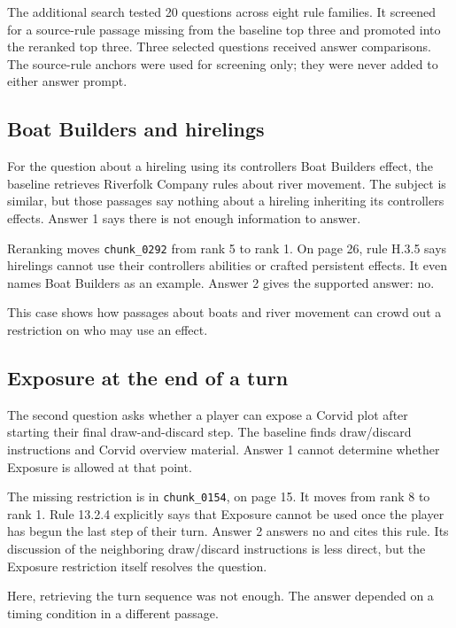 \documentclass[11pt,a4paper]{article}
\begin{document}
The additional search tested 20 questions across eight rule families.
It screened for a source-rule passage missing from the baseline top three
and promoted into the reranked top three. Three selected questions received
answer comparisons. The source-rule anchors were used for screening only;
they were never added to either answer prompt.

\subsection*{Boat Builders and hirelings}

For the question about a hireling using its
controller\textquotesingle{}s Boat Builders effect, the baseline retrieves
Riverfolk Company rules about river movement. The subject is similar, but
those passages say nothing about a hireling inheriting its
controller\textquotesingle{}s effects. Answer 1 says there is not enough
information to answer.

Reranking moves \texttt{chunk\_0292} from rank 5 to rank 1. On page 26,
rule H.3.5 says hirelings cannot use their
controller\textquotesingle{}s abilities or crafted persistent effects.
It even names Boat Builders as an example. Answer 2 gives the supported
answer: no.

This case shows how passages about boats and river movement can crowd out
a restriction on who may use an effect.

\subsection*{Exposure at the end of a turn}

The second question asks whether a player can expose a Corvid plot after
starting their final draw-and-discard step. The baseline finds draw/discard
instructions and Corvid overview material. Answer 1 cannot determine
whether Exposure is allowed at that point.

The missing restriction is in \texttt{chunk\_0154}, on page 15. It moves
from rank 8 to rank 1. Rule 13.2.4 explicitly says that Exposure cannot be
used once the player has begun the last step of their turn. Answer 2
answers no and cites this rule. Its discussion of the neighboring
draw/discard instructions is less direct, but the Exposure restriction
itself resolves the question.

Here, retrieving the turn sequence was not enough. The answer depended
on a timing condition in a different passage.
\end{document}
